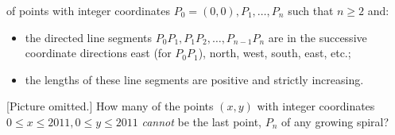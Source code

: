 of points with integer coordinates $P_0 = (0,0), P_1, \dots, P_n$ such
that $n \geq 2$ and:
\begin{itemize}
\item the directed line segments $P_0 P_1, P_1 P_2, \dots, P_{n-1} P_n$
are in the successive coordinate directions east (for $P_0 P_1$), north,
west, south, east, etc.;
\item the lengths of these line segments are positive and strictly
increasing.
\end{itemize} [Picture omitted.]  How many of the points $(x,y)$ with
integer coordinates $0\leq x\leq 2011, 0\leq y\leq 2011$ \emph{cannot}
be the last point, $P_n$ of any growing spiral?
